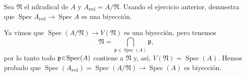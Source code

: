 \begin{ejer}
Sea $\mathfrak{N}$ el nilradical de $A$ y $A_{\mathrm{red}}=A/\mathfrak{N}$. Usando el ejercicio anterior, demuestra que $\operatorname{Spec}A_{\mathrm{red}}\to\operatorname{Spec}A$ es una biyección.
\end{ejer}
\begin{sol}
Ya vimos que $\operatorname{Spec}(A/\mathfrak{N})\to V(\mathfrak{N})$ es una biyección, pero tenemos
\[
\mathfrak{N}=\bigcap_{\mathfrak{p}\in\operatorname{Spec}(A)}\mathfrak{p},
\]
por lo tanto todo $\mathfrak{p}\en\operatorname{Spec}(A)$ contiene a $\mathfrak{N}$ y, así, $V(\mathfrak{N})=\operatorname{Spec}(A)$. Hemos probado que $\operatorname{Spec}(A_{\mathrm{red}})=\operatorname{Spec}(A/\mathfrak{N})\to\operatorname{Spec}(A)$ es biyección.
\end{sol}